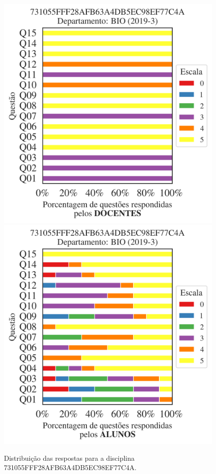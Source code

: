 \documentclass[a4paper,10pt]{article}
\begin{document}
\begin{figure}[h]
\centering
\includegraphics[width=0.485\linewidth]{analise_disciplina_departamento_BIO_731055FFF28AFB63A4DB5EC98EF77C4A_docentes.png}
\includegraphics[width=0.485\linewidth]{analise_disciplina_departamento_BIO_731055FFF28AFB63A4DB5EC98EF77C4A_alunos.png}
\caption{\label{fig:analise_geral_departamento}                Distribuição das respostas para a disciplina 731055FFF28AFB63A4DB5EC98EF77C4A. }
\end{figure}
\end{document}
